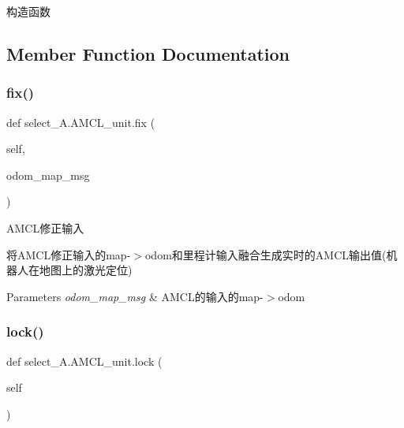 构造函数 



\subsection{Member Function Documentation}
\mbox{\label{classselect___a_1_1_a_m_c_l__unit_a586f600a47a66f0e69275fe2fcc8fd65}} 
\subsubsection{\texorpdfstring{fix()}{fix()}}
{\footnotesize\ttfamily def select\+\_\+\+A.\+A\+M\+C\+L\+\_\+unit.\+fix (\begin{DoxyParamCaption}\item[{}]{self,  }\item[{}]{odom\+\_\+map\+\_\+msg }\end{DoxyParamCaption})}



A\+M\+C\+L修正输入 

将\+A\+M\+C\+L修正输入的map-\/$>$odom和里程计输入融合生成实时的\+A\+M\+C\+L输出值(机器人在地图上的激光定位)


\begin{DoxyParams}{Parameters}
{\em odom\+\_\+map\+\_\+msg} & A\+M\+C\+L的输入的map-\/$>$odom \\
\hline
\end{DoxyParams}
\mbox{\label{classselect___a_1_1_a_m_c_l__unit_a1889f634cc13d1c3a83eb45c5ef22d54}} 
\subsubsection{\texorpdfstring{lock()}{lock()}}
{\footnotesize\ttfamily def select\+\_\+\+A.\+A\+M\+C\+L\+\_\+unit.\+lock (\begin{DoxyParamCaption}\item[{}]{self }\end{DoxyParamCaption})}



